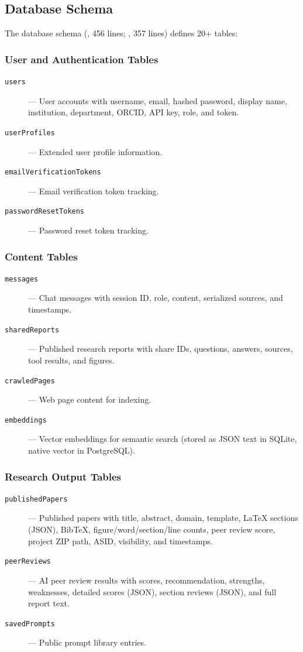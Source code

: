 \subsection{Database Schema}

The database schema (, 456 lines; , 357 lines) defines 20+ tables:

\subsubsection{User and Authentication Tables}

\begin{description}
  \item[\texttt{users}] --- User accounts with username, email, hashed password, display name, institution, department, ORCID, API key, role, and token.
  \item[\texttt{userProfiles}] --- Extended user profile information.
  \item[\texttt{emailVerificationTokens}] --- Email verification token tracking.
  \item[\texttt{passwordResetTokens}] --- Password reset token tracking.
\end{description}

\subsubsection{Content Tables}

\begin{description}
  \item[\texttt{messages}] --- Chat messages with session ID, role, content, serialized sources, and timestamps.
  \item[\texttt{sharedReports}] --- Published research reports with share IDs, questions, answers, sources, tool results, and figures.
  \item[\texttt{crawledPages}] --- Web page content for indexing.
  \item[\texttt{embeddings}] --- Vector embeddings for semantic search (stored as JSON text in SQLite, native vector in PostgreSQL).
\end{description}

\subsubsection{Research Output Tables}

\begin{description}
  \item[\texttt{publishedPapers}] --- Published papers with title, abstract, domain, template, \LaTeX{} sections (JSON), BibTeX, figure/word/section/line counts, peer review score, project ZIP path, ASID, visibility, and timestamps.
  \item[\texttt{peerReviews}] --- AI peer review results with scores, recommendation, strengths, weaknesses, detailed scores (JSON), section reviews (JSON), and full report text.
  \item[\texttt{savedPrompts}] --- Public prompt library entries.
\end{description}

